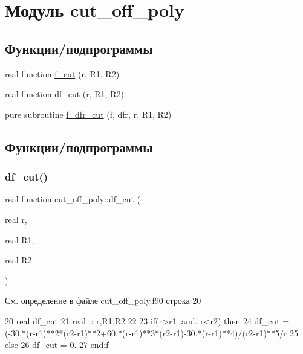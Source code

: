 \hypertarget{namespacecut__off__poly}{}\section{Модуль cut\+\_\+off\+\_\+poly}
\label{namespacecut__off__poly}
\subsection*{Функции/подпрограммы}
\begin{DoxyCompactItemize}
\item 
real function \mbox{\hyperlink{namespacecut__off__poly_a86929565d0a548608692680a8cd98cdc}{f\+\_\+cut}} (r, R1, R2)
\item 
real function \mbox{\hyperlink{namespacecut__off__poly_a5c318e9af5df6d48494b93a14ac45f00}{df\+\_\+cut}} (r, R1, R2)
\item 
pure subroutine \mbox{\hyperlink{namespacecut__off__poly_aa06a8a5bc68fa128e1a5bb543fce787b}{f\+\_\+dfr\+\_\+cut}} (f, dfr, r, R1, R2)
\end{DoxyCompactItemize}


\subsection{Функции/подпрограммы}
\mbox{\label{namespacecut__off__poly_a5c318e9af5df6d48494b93a14ac45f00}} 
\subsubsection{\texorpdfstring{df\+\_\+cut()}{df\_cut()}}
{\footnotesize\ttfamily real function cut\+\_\+off\+\_\+poly\+::df\+\_\+cut (\begin{DoxyParamCaption}\item[{real}]{r,  }\item[{real}]{R1,  }\item[{real}]{R2 }\end{DoxyParamCaption})}



См. определение в файле cut\+\_\+off\+\_\+poly.\+f90 строка 20


\begin{DoxyCode}
20     \textcolor{keywordtype}{real} df\_cut
21     \textcolor{keywordtype}{real} :: r,R1,R2
22 
23     \textcolor{keywordflow}{if}(r>r1 .and. r<r2) \textcolor{keywordflow}{then}
24         df\_cut = (-30.*(r-r1)**2*(r2-r1)**2+60.*(r-r1)**3*(r2-r1)-30.*(r-r1)**4)/(r2-r1)**5/r
25     \textcolor{keywordflow}{else}
26         df\_cut = 0.
27 \textcolor{keywordflow}{    endif}   
\end{DoxyCode}
\mbox{\label{namespacecut__off__poly_a86929565d0a548608692680a8cd98cdc}} 
